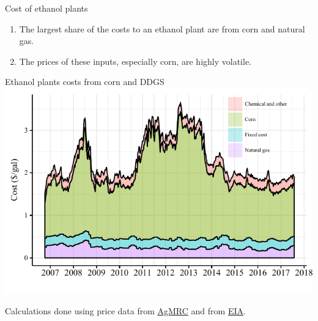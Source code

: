\documentclass[table,xcolor=pdftex,dvipsnames]{beamer}\usepackage[]{graphicx}\usepackage[]{color}
\makeatletter
\def\maxwidth{ %
  \ifdim\Gin@nat@width>\linewidth
    \linewidth
  \else
    \Gin@nat@width
  \fi
}
\newenvironment{knitrout}{}{} %
\makeatother
\begin{document}

\begin{frame}{Cost of ethanol plants}
\begin{enumerate}[label=\textbullet]
    \item The largest share of the costs to an ethanol plant are from corn and natural gas.
    \item The prices of these inputs, especially corn, are highly volatile.
\end{enumerate}
\end{frame}



\begin{frame}{Ethanol plants costs from corn and DDGS}
\begin{knitrout}
\color{fgcolor}
\includegraphics[width=\maxwidth]{figure/figure_cost-1} 

\end{knitrout}
\vspace{-1\baselineskip}
\scriptsize
Calculations done using price data from \href{http://www.extension.iastate.edu/agdm/energy/xls/agmrcethanolplantprices.xlsx}{AgMRC} and from \href{http://www.eia.gov/dnav/ng/ng_pri_sum_dcu_sia_m.htm}{EIA}.
\end{frame}

\end{document}
